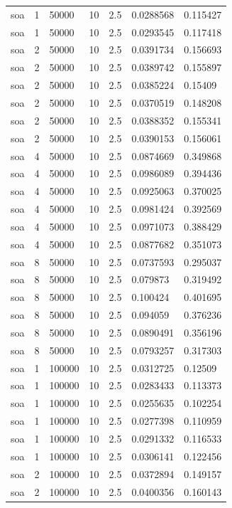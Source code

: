 \begin{table}[ht]
\begin{tabular}{lllllll}
soa & 1 & 50000 & 10 & 2.5 & 0.0288568 & 0.115427 \\ 
soa & 1 & 50000 & 10 & 2.5 & 0.0293545 & 0.117418 \\ 
soa & 2 & 50000 & 10 & 2.5 & 0.0391734 & 0.156693 \\ 
soa & 2 & 50000 & 10 & 2.5 & 0.0389742 & 0.155897 \\ 
soa & 2 & 50000 & 10 & 2.5 & 0.0385224 & 0.15409 \\ 
soa & 2 & 50000 & 10 & 2.5 & 0.0370519 & 0.148208 \\ 
soa & 2 & 50000 & 10 & 2.5 & 0.0388352 & 0.155341 \\ 
soa & 2 & 50000 & 10 & 2.5 & 0.0390153 & 0.156061 \\ 
soa & 4 & 50000 & 10 & 2.5 & 0.0874669 & 0.349868 \\ 
soa & 4 & 50000 & 10 & 2.5 & 0.0986089 & 0.394436 \\ 
soa & 4 & 50000 & 10 & 2.5 & 0.0925063 & 0.370025 \\ 
soa & 4 & 50000 & 10 & 2.5 & 0.0981424 & 0.392569 \\ 
soa & 4 & 50000 & 10 & 2.5 & 0.0971073 & 0.388429 \\ 
soa & 4 & 50000 & 10 & 2.5 & 0.0877682 & 0.351073 \\ 
soa & 8 & 50000 & 10 & 2.5 & 0.0737593 & 0.295037 \\ 
soa & 8 & 50000 & 10 & 2.5 & 0.079873 & 0.319492 \\ 
soa & 8 & 50000 & 10 & 2.5 & 0.100424 & 0.401695 \\ 
soa & 8 & 50000 & 10 & 2.5 & 0.094059 & 0.376236 \\ 
soa & 8 & 50000 & 10 & 2.5 & 0.0890491 & 0.356196 \\ 
soa & 8 & 50000 & 10 & 2.5 & 0.0793257 & 0.317303 \\ 
soa & 1 & 100000 & 10 & 2.5 & 0.0312725 & 0.12509 \\ 
soa & 1 & 100000 & 10 & 2.5 & 0.0283433 & 0.113373 \\ 
soa & 1 & 100000 & 10 & 2.5 & 0.0255635 & 0.102254 \\ 
soa & 1 & 100000 & 10 & 2.5 & 0.0277398 & 0.110959 \\ 
soa & 1 & 100000 & 10 & 2.5 & 0.0291332 & 0.116533 \\ 
soa & 1 & 100000 & 10 & 2.5 & 0.0306141 & 0.122456 \\ 
soa & 2 & 100000 & 10 & 2.5 & 0.0372894 & 0.149157 \\ 
soa & 2 & 100000 & 10 & 2.5 & 0.0400356 & 0.160143 \\ 

\end{tabular}
\end{table}

